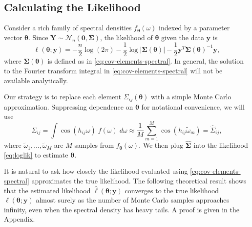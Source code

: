 

\subsection{Calculating the Likelihood} %
\label{sec:calculating_the_likelihood}

Consider a rich family of spectral densities $f_{\bm{\theta}}(\omega)$ indexed by a parameter vector $\bm{\theta}$.  Since $\bm{Y} \sim \mathcal{N}_n(\bm{0}, \bm{\Sigma})$, the likelihood of $\bm{\theta}$ given the data $\bm{y}$ is
\begin{equation} \label{eq:loglik}
	\ell(\bm{\theta}; \bm{y}) = -\frac{n}{2} \log(2\pi) - \frac{1}{2} \log |\bm{\Sigma}(\bm{\theta})| - \frac{1}{2} \bm{y}^T \bm{\Sigma}(\bm{\theta})^{-1} \bm{y},
\end{equation}
where $\bm{\Sigma}(\bm{\theta})$ is defined as in \eqref{eq:cov-elements-spectral}.  In general, the solution to the Fourier transform integral in \eqref{eq:cov-elements-spectral} will not be available analytically.

Our strategy is to replace each element $\Sigma_{ij}(\bm{\theta})$ with a simple Monte Carlo approximation.  Suppressing dependence on $\bm{\theta}$ for notational convenience, we will use  
\begin{equation}
	\Sigma_{ij} = \int \cos(h_{ij}\omega) \; f(\omega) \; d\omega \approx  \frac{1}{M} \sum_{m=1}^M \cos(h_{ij}\widetilde{\omega}_m) = \widehat{\Sigma}_{ij},
\end{equation}
where $\widetilde{\omega}_1, \dots, \widetilde{\omega}_M$ are $M$ samples from $f_{\bm{\theta}}(\omega)$. We then plug $\widehat{\bm{\Sigma}}$ into the likelihood \eqref{eq:loglik} to estimate $\bm{\theta}$.


It is natural to ask how closely the likelihood evaluated using \eqref{eq:cov-elements-spectral} approximates the true likelihood.  The following theoretical result shows that the estimated likelihood $\hat{\ell}(\bm{\theta}; \bm{y})$ converges to the true likelihood $\ell(\bm{\theta}; \bm{y})$ almost surely as the number of Monte Carlo samples approaches infinity, even when the spectral density has heavy tails. A proof is given in the Appendix.

